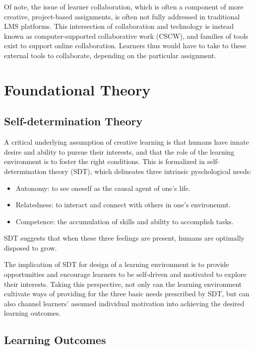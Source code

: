 \documentclass[12pt,twoside]{mitthesis}
\begin{document}
Of note, the issue of learner collaboration, which is often a component of more creative, project-based assignments, is often not fully addressed in traditional LMS platforms. This intersection of collaboration and technology is instead known as computer-supported collaborative work (CSCW), and families of tools exist to support online collaboration. Learners thus would have to take to these external tools to collaborate, depending on the particular assignment.

\section{Foundational Theory}

\subsection{Self-determination Theory}

A critical underlying assumption of creative learning is that humans have innate desire and ability to pursue their interests, and that the role of the learning environment is to foster the right conditions. This is formalized in self-determination theory (SDT), which delineates three intrinsic pyschological needs:
\begin{itemize}
\item Autonomy: to see oneself as the causal agent of one's life.
\item Relatedness: to interact and connect with others in one's environemnt.
\item Competence: the accumulation of skills and ability to accomplish tasks.
\end{itemize}
SDT suggests that when these three feelings are present, humans are optimally disposed to grow.~\cite{ryan2000self}\cite{selfdetermination2}

The implication of SDT for design of a learning environment is to provide opportunities and encourage learners to be self-driven and motivated to explore their interests. Taking this perspective, not only can the learning environment cultivate ways of providing for the three basic needs prescribed by SDT, but can also channel learners' assumed individual motivation into achieving the desired learning outcomes.~\cite{selfdetermination}\cite{niemiec2009autonomy}

\subsection{Learning Outcomes}
\end{document}
